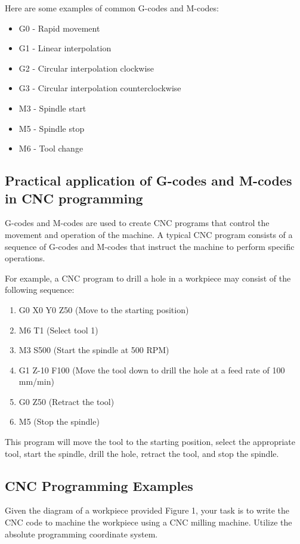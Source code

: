 \documentclass{article}
\begin{document}
Here are some examples of common G-codes and M-codes:
\begin{itemize}
    \item G0 - Rapid movement
    \item G1 - Linear interpolation
    \item G2 - Circular interpolation clockwise
    \item G3 - Circular interpolation counterclockwise
    \item M3 - Spindle start
    \item M5 - Spindle stop
    \item M6 - Tool change
\end{itemize}

\subsection*{Practical application of G-codes and M-codes in CNC programming}
G-codes and M-codes are used to create CNC programs that control the movement and operation of the machine. A typical CNC program consists of a sequence of G-codes and M-codes that instruct the machine to perform specific operations.

For example, a CNC program to drill a hole in a workpiece may consist of the following sequence:
\begin{enumerate}
    \item G0 X0 Y0 Z50 (Move to the starting position)
    \item M6 T1 (Select tool 1)
    \item M3 S500 (Start the spindle at 500 RPM)
    \item G1 Z-10 F100 (Move the tool down to drill the hole at a feed rate of 100 mm/min)
    \item G0 Z50 (Retract the tool)
    \item M5 (Stop the spindle)
\end{enumerate}

This program will move the tool to the starting position, select the appropriate tool, start the spindle, drill the hole, retract the tool, and stop the spindle.

\subsection{CNC Programming Examples}
Given the diagram of a workpiece provided Figure 1, your task is to write the CNC code to machine the workpiece using a CNC milling machine. Utilize the absolute programming coordinate system.\\
\end{document}

